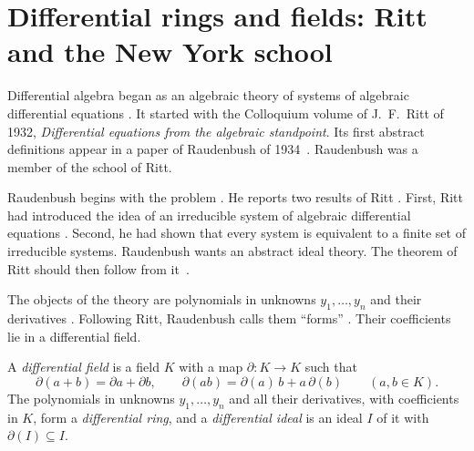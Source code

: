 \section[Differential rings and fields: Ritt and the New York school][Differential rings and fields]{Differential rings and fields: Ritt and the New York school}\label{sec:origins:differential-algebra}

Differential algebra began as an algebraic theory of systems of algebraic
differential equations \cite{Raudenbush1934}. It started with the Colloquium
volume of J.~F.~Ritt of 1932, \emph{Differential equations from the algebraic
standpoint}. Its first abstract definitions appear in a paper of Raudenbush of
1934~\cite{Raudenbush1934}. Raudenbush was a member of the school of Ritt.

Raudenbush begins with the problem \cite[p.~361]{Raudenbush1934}. He reports
two results of Ritt \cite[p.~361]{Raudenbush1934}. First, Ritt had introduced
the idea of an irreducible system of algebraic differential equations
\cite[p.~361]{Raudenbush1934}. Second, he had shown that every system is
equivalent to a finite set of irreducible systems. Raudenbush wants an
abstract ideal theory. The theorem of Ritt should then follow from
it~\cite[p.~361]{Raudenbush1934}.

The objects of the theory are polynomials in unknowns $y_1, \ldots, y_n$ and
their derivatives \cite[p.~361]{Raudenbush1934}. Following Ritt, Raudenbush
calls them ``forms'' \cite[p.~361]{Raudenbush1934}. Their coefficients lie in
a differential field.

\begin{definition}\label{def:origins:differential-field}
A \emph{differential field} is a field $K$ with a map $\partial\colon K \to K$
such that
\[
\partial(a+b) = \partial a + \partial b, \qquad \partial(ab) = \partial(a)\, b + a\, \partial(b)
\qquad (a, b \in K).
\]
The polynomials in unknowns $y_1, \ldots, y_n$ and all their derivatives, with
coefficients in $K$, form a \emph{differential ring}, and a
\emph{differential ideal} is an ideal $I$ of it with $\partial(I) \subseteq I$.
\end{definition}

